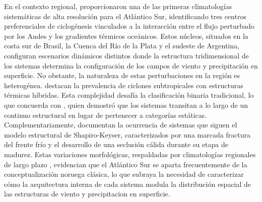 En el contexto regional, \citet{reboita2010south} proporcionaron una de las primeras climatologías sistemáticas de alta resolución para el Atlántico Sur, identificando tres centros preferenciales de ciclogénesis vinculados a la interacción entre el flujo perturbado por los Andes y los gradientes térmicos oceánicos. Estos núcleos, situados en la costa sur de Brasil, la Cuenca del Río de la Plata y el sudeste de Argentina, configuran escenarios dinámicos distintos donde la estructura tridimensional de los sistemas determina la configuración de los campos de viento y precipitación en superficie.
%
%
No obstante, la naturaleza de estas perturbaciones en la región es heterogénea. \citet{evans2012climatology} destacan la prevalencia de ciclones subtropicales con estructuras térmicas híbridas. %
Esta complejidad desafía la clasificación binaria tradicional, lo que concuerda con \citet{hart2003cyclone}, quien demostró que los sistemas transitan a lo largo de un continuo estructural en lugar de pertenecer a categorías estáticas. Complementariamente, \citet{gozzo2013air} documentan la ocurrencia de sistemas que siguen el modelo estructural de Shapiro-Keyser, caracterizados por una marcada fractura del frente frío y el desarrollo de una seclusión cálida durante su etapa de madurez. Estas variaciones morfológicas, respaldadas por climatologías regionales de largo plazo \citep{gozzo2014subtropical}, evidencian que el Atlántico Sur se aparta frecuentemente de la conceptualización noruega clásica, lo que subraya la necesidad de caracterizar cómo la arquitectura interna de cada sistema modula la distribución espacial de las estructuras de viento y precipitacion en superficie.
